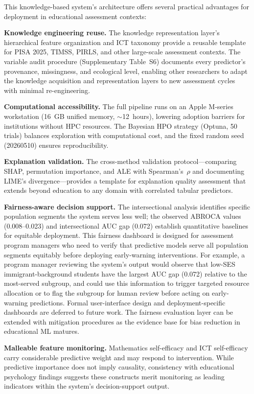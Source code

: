 \documentclass[review,12pt]{elsarticle}
\begin{document}
This knowledge-based system's architecture offers several practical advantages for deployment in educational assessment contexts:

\textbf{Knowledge engineering reuse.} The knowledge representation layer's hierarchical feature organization and ICT taxonomy provide a reusable template for PISA 2025, TIMSS, PIRLS, and other large-scale assessment contexts. The variable audit procedure (Supplementary Table~S6) documents every predictor's provenance, missingness, and ecological level, enabling other researchers to adapt the knowledge acquisition and representation layers to new assessment cycles with minimal re-engineering.

\textbf{Computational accessibility.} The full pipeline runs on an Apple M-series workstation (16~GB unified memory, $\sim$12~hours), lowering adoption barriers for institutions without HPC resources. The Bayesian HPO strategy (Optuna, 50 trials) balances exploration with computational cost, and the fixed random seed (20260510) ensures reproducibility.

\textbf{Explanation validation.} The cross-method validation protocol---comparing SHAP, permutation importance, and ALE with Spearman's~$\rho$ and documenting LIME's divergence---provides a template for explanation quality assessment that extends beyond education to any domain with correlated tabular predictors.

\textbf{Fairness-aware decision support.} The intersectional analysis identifies specific population segments the system serves less well; the observed ABROCA values (0.008--0.023) and intersectional AUC gap (0.072) establish quantitative baselines for equitable deployment. This fairness dashboard is designed for assessment program managers who need to verify that predictive models serve all population segments equitably before deploying early-warning interventions. For example, a program manager reviewing the system's output would observe that low-SES immigrant-background students have the largest AUC gap (0.072) relative to the most-served subgroup, and could use this information to trigger targeted resource allocation or to flag the subgroup for human review before acting on early-warning predictions. Formal user-interface design and deployment-specific dashboards are deferred to future work. The fairness evaluation layer can be extended with mitigation procedures as the evidence base for bias reduction in educational ML matures.

\textbf{Malleable feature monitoring.} Mathematics self-efficacy and ICT self-efficacy carry considerable predictive weight and may respond to intervention. While predictive importance does not imply causality, consistency with educational psychology findings \citep{Bandura_1977_self_efficacy} suggests these constructs merit monitoring as leading indicators within the system's decision-support output.
\end{document}
